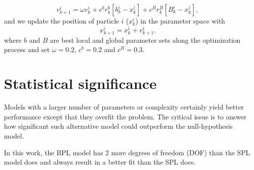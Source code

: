 \begin{equation}
    v^i_{k+1} = \omega v^i_k + c^br^b_k[b^i_k-x^i_k] + c^Br^B_k[B^i_k-x^i_k],
    \label{eq:pso}
\end{equation}
and we update the position of particle $i$ ($x^i_k$) in the parameter space with
\begin{equation}
    x^i_{k+1} = x^i_k + v^i_{k+1}.
    \label{eq:pso_update}
\end{equation}
where $b$ and $B$ are best local and global parameter sets
along the optimization process
and set $\omega = 0.2$, $c^b = 0.2$ and $c^B = 0.3$.

\section{Statistical significance}

Models with a larger number of parameters or complexity certainly
yield better performance except that they overfit the problem.
The critical issue is to answer how significant such alternative 
model could outperform the null-hypothesis model.

In this work, the BPL model has 2 more degrees of freedom (DOF) than
the SPL model does and always result in a better fit than the SPL does.


